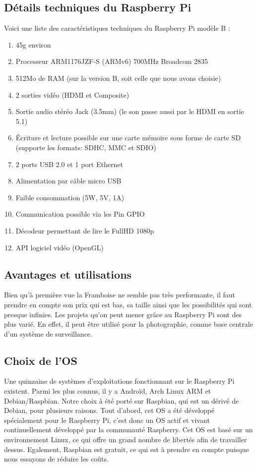 \documentclass[a4paper,11pt]{report}
\begin{document}
{\subsection{Détails techniques du Raspberry Pi}
Voici une liste des caractéristiques techniques du Raspberry Pi modèle B \cite{RaspberryPiCaracteristiques}:
\begin{enumerate}
\item 45g environ
\item Processeur ARM1176JZF-S (ARMv6) 700MHz Broadcom 2835
\item 512Mo de RAM (sur la version B, soit celle que nous avons choisie)
\item 2 sorties vidéo (HDMI et Composite) 
\item Sortie audio stéréo Jack (3.5mm) (le son passe aussi par le HDMI en sortie 5.1)
\item Écriture et lecture possible sur une carte mémoire sous forme de carte SD (supporte les formats: SDHC, MMC et SDIO)
\item 2 ports USB 2.0 et 1 port Ethernet
\item Alimentation par câble micro USB
\item Faible consommation (5W, 5V, 1A)
\item Communication possible via les Pin GPIO
\item Décodeur permettant de lire le FullHD  1080p
\item API logiciel vidéo (OpenGL)
\end{enumerate}

\subsection{Avantages et utilisations}
Bien qu'à première vue la Framboise ne semble pas très performante, il faut prendre en compte son prix qui est bas, sa taille ainsi que les possibilités qui sont presque infinies. Les projets qu'on peut mener grâce au Raspberry Pi sont des plus varié. En effet, il peut être utilisé pour la photographie, comme base centrale d'un système de surveillance. 

\subsection{Choix de l'OS}
Une quinzaine de systèmes d'exploitations fonctionnant sur le Raspberry Pi existent. Parmi les plus connus, il y a Androïd, Arch Linux ARM et Debian/Raspbian. 
Notre choix à été porté sur Raspbian, qui est un dérivé de Debian, pour plusieurs raisons. Tout d'abord, cet OS a été développé spécialement pour le Raspberry Pi, c'est donc un OS actif et vivant continuellement développé par la communauté Raspberry. Cet OS est basé sur un environnement Linux, ce qui offre un grand nombre de libertés afin de travailler dessus. Egalement, Raspbian est gratuit, ce qui est à prendre en compte puisque nous essayons de réduire les coûts.  


}
\end{document}
